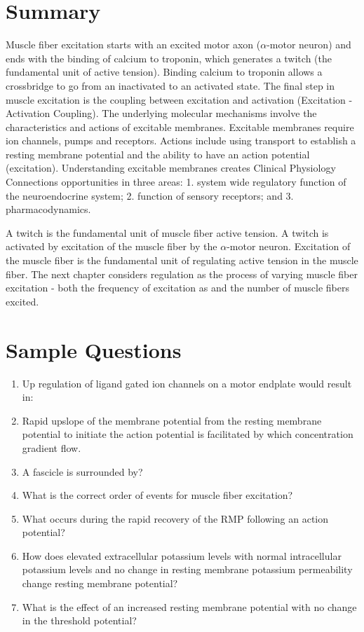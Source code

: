 \section{Summary}

Muscle fiber excitation starts with an excited motor axon ($\alpha$-motor neuron) and ends with the binding of calcium to troponin, which generates a twitch (the fundamental unit of active tension). Binding calcium to troponin allows a crossbridge to go from an inactivated to an activated state. The final step in muscle excitation is the coupling between excitation and activation (Excitation - Activation Coupling). The underlying molecular mechanisms involve the characteristics and actions of excitable membranes. Excitable membranes require ion channels, pumps and receptors. Actions include using transport to establish a resting membrane potential and the ability to have an action potential (excitation). Understanding excitable membranes creates Clinical Physiology Connections opportunities in three areas: 1. system wide regulatory function of the neuroendocrine system; 2. function of sensory receptors; and 3. pharmacodynamics.

A twitch is the fundamental unit of muscle fiber active tension. A twitch is activated by excitation of the muscle fiber by the $\alpha$-motor neuron. Excitation of the muscle fiber is the fundamental unit of regulating active tension in the muscle fiber. The next chapter considers regulation as the process of varying muscle fiber excitation - both the frequency of excitation as and the number of muscle fibers excited.


\printbibliography[heading=subbibintoc]

\section*{Sample Questions}

\begin{enumerate}
    \item Up regulation of ligand gated ion channels on a motor endplate would result in:
    \item Rapid upslope of the membrane potential from the resting membrane potential to initiate the action potential is facilitated by which concentration gradient flow.
    \item A fascicle is surrounded by?
    \item What is the correct order of events for muscle fiber excitation?
    \item What occurs during the rapid recovery of the RMP following an action potential?
    \item How does elevated extracellular potassium levels with normal intracellular potassium levels and no change in resting membrane potassium permeability change resting membrane potential?
    \item What is the effect of an increased resting membrane potential with no change in the threshold potential?
\end{enumerate} 



